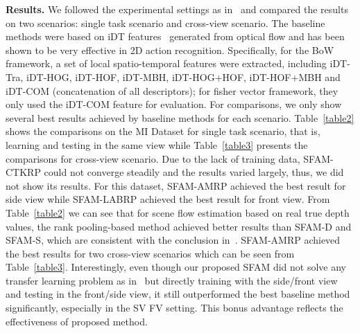 \documentclass[10pt,twocolumn,letterpaper]{article}
\begin{document}
\textbf{Results.} We followed the experimental settings as 
in~\cite{liu2016benchmarking} 
and compared the results on two scenarios: single task scenario and cross-view 
scenario. 
 The baseline methods were based on iDT features~\cite{wang2013action}  
generated from optical flow and has been shown to be very effective in 2D 
action recognition. Specifically, for the BoW framework, a set of local 
spatio-temporal features were extracted, including iDT-Tra, iDT-HOG, iDT-HOF, 
iDT-MBH, iDT-HOG+HOF, iDT-HOF+MBH and iDT-COM (concatenation of all 
descriptors); for fisher vector framework, they only used the iDT-COM feature 
for evaluation. For comparisons, we only show several best results achieved by 
baseline methods for each scenario. Table~\ref{table2} shows the comparisons on 
the MI Dataset for single task scenario, that is, learning and 
testing in the same view while Table~\ref{table3} presents the comparisons for 
cross-view scenario. Due to the lack of training data, SFAM-CTKRP could not 
converge steadily and the results varied largely, thus, we did not show its 
results. For this dataset, SFAM-AMRP achieved the best result for side view 
while SFAM-LABRP achieved the best result for front view. From 
Table~\ref{table2} we can see that for scene flow estimation based on real true 
depth values, the rank pooling-based method achieved better results than SFAM-D 
and SFAM-S, which are consistent with the conclusion 
in~\cite{liu2016benchmarking}. SFAM-AMRP achieved the best results for two 
cross-view scenarios which can be seen from Table~\ref{table3}.  Interestingly, 
even though our proposed SFAM  did not solve any transfer learning problem as 
in~\cite{liu2016benchmarking} but directly training with the side/front view 
and testing in the front/side view, it still outperformed the best baseline 
method significantly, especially in the SV  FV setting. This bonus 
advantage reflects the effectiveness of proposed method. 
\end{document}
